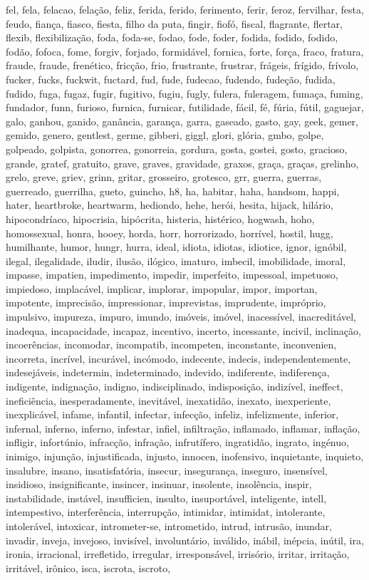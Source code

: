 fel, fela, felacao, felação, feliz, ferida, ferido, ferimento, ferir, feroz, fervilhar, festa, feudo, fiança, fiasco, fiesta, filho da puta, fingir, fiofó, fiscal, flagrante, flertar, flexib, flexibilização, foda, foda-se, fodao, fode, foder, fodida, fodido, fodido, fodão, fofoca, fome, forgiv, forjado, formidável, fornica, forte, força, fraco, fratura, fraude, fraude, frenético, fricção, frio, frustrante, frustrar, frágeis, frígido, frívolo, fucker, fucks, fuckwit, fuctard, fud, fude, fudecao, fudendo, fudeção, fudida, fudido, fuga, fugaz, fugir, fugitivo, fugiu, fugly, fulera, fuleragem, fumaça, fuming, fundador, funn, furioso, furnica, furnicar, futilidade, fácil, fé, fúria, fútil, gaguejar, galo, ganhou, ganido, ganância, garança, garra, gaseado, gasto, gay, geek, gemer, gemido, genero, gentlest, germe, gibberi, giggl, glori, glória, gmbo, golpe, golpeado, golpista, gonorrea, gonorreia, gordura, gosta, gostei, gosto, gracioso, grande, gratef, gratuito, grave, graves, gravidade, graxos, graça, graças, grelinho, grelo, greve, griev, grinn, gritar, grosseiro, grotesco, grr, guerra, guerras, guerreado, guerrilha, gueto, guincho, h8, ha, habitar, haha, handsom, happi, hater, heartbroke, heartwarm, hediondo, hehe, herói, hesita, hijack, hilário, hipocondríaco, hipocrisia, hipócrita, histeria, histérico, hogwash, hoho, homossexual, honra, hooey, horda, horr, horrorizado, horrível, hostil, hugg, humilhante, humor, hungr, hurra, ideal, idiota, idiotas, idiotice, ignor, ignóbil, ilegal, ilegalidade, iludir, ilusão, ilógico, imaturo, imbecil, imobilidade, imoral, impasse, impatien, impedimento, impedir, imperfeito, impessoal, impetuoso, impiedoso, implacável, implicar, implorar, impopular, impor, importan, impotente, imprecisão, impressionar, imprevistas, imprudente, impróprio, impulsivo, impureza, impuro, imundo, imóveis, imóvel, inacessível, inacreditável, inadequa, incapacidade, incapaz, incentivo, incerto, incessante, incivil, inclinação, incoerências, incomodar, incompatib, incompeten, inconstante, inconvenien, incorreta, incrível, incurável, incómodo, indecente, indecis, independentemente, indesejáveis, indetermin, indeterminado, indevido, indiferente, indiferença, indigente, indignação, indigno, indisciplinado, indisposição, indizível, ineffect, ineficiência, inesperadamente, inevitável, inexatidão, inexato, inexperiente, inexplicável, infame, infantil, infectar, infecção, infeliz, infelizmente, inferior, infernal, inferno, inferno, infestar, infiel, infiltração, inflamado, inflamar, inflação, infligir, infortúnio, infracção, infração, infrutífero, ingratidão, ingrato, ingénuo, inimigo, injunção, injustificada, injusto, innocen, inofensivo, inquietante, inquieto, insalubre, insano, insatisfatória, insecur, insegurança, inseguro, insensível, insidioso, insignificante, insincer, insinuar, insolente, insolência, inspir, instabilidade, instável, insufficien, insulto, insuportável, inteligente, intell, intempestivo, interferência, interrupção, intimidar, intimidat, intolerante, intolerável, intoxicar, intrometer-se, intrometido, intrud, intrusão, inundar, invadir, inveja, invejoso, invisível, involuntário, inválido, inábil, inépcia, inútil, ira, ironia, irracional, irrefletido, irregular, irresponsável, irrisório, irritar, irritação, irritável, irônico, isca, iscrota, iscroto, 